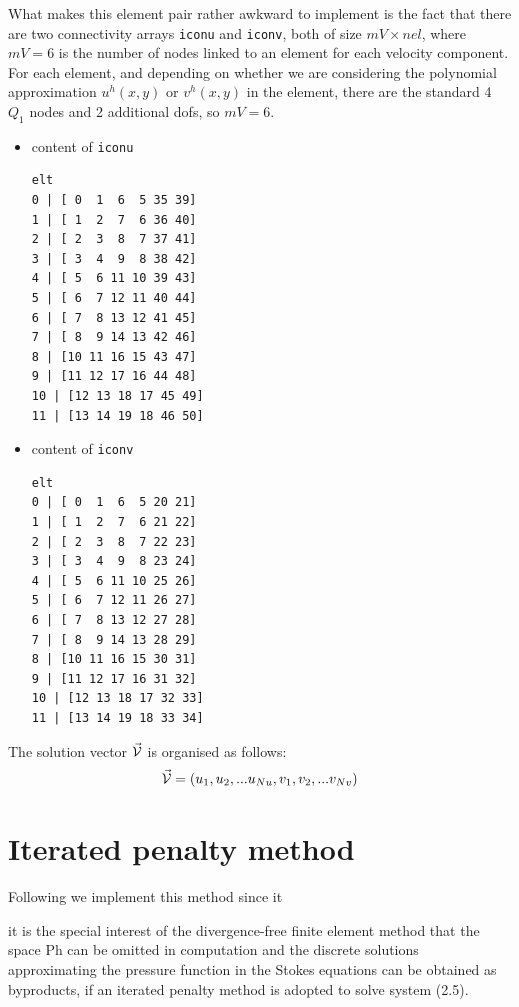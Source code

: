 What makes this element pair rather awkward to implement is the fact that 
there are two connectivity arrays {\tt iconu} and {\tt iconv}, both of size $mV\times nel$, where 
$mV=6$ is the number of nodes linked to an element for each velocity component. 
For each element, and depending on whether we are considering 
the polynomial approximation $u^h(x,y)$ or $v^h(x,y)$ in the element, there are the standard 4 $Q_1$ nodes and 2 additional 
dofs, so $mV=6$.
\begin{itemize}
\item content of {\tt iconu}
\begin{verbatim}
elt
0 | [ 0  1  6  5 35 39]
1 | [ 1  2  7  6 36 40]
2 | [ 2  3  8  7 37 41]
3 | [ 3  4  9  8 38 42]
4 | [ 5  6 11 10 39 43]
5 | [ 6  7 12 11 40 44]
6 | [ 7  8 13 12 41 45]
7 | [ 8  9 14 13 42 46]
8 | [10 11 16 15 43 47]
9 | [11 12 17 16 44 48]
10 | [12 13 18 17 45 49]
11 | [13 14 19 18 46 50]
\end{verbatim}
\item content of {\tt iconv}
\begin{verbatim}
elt
0 | [ 0  1  6  5 20 21]
1 | [ 1  2  7  6 21 22]
2 | [ 2  3  8  7 22 23]
3 | [ 3  4  9  8 23 24]
4 | [ 5  6 11 10 25 26]
5 | [ 6  7 12 11 26 27]
6 | [ 7  8 13 12 27 28]
7 | [ 8  9 14 13 28 29]
8 | [10 11 16 15 30 31]
9 | [11 12 17 16 31 32]
10 | [12 13 18 17 32 33]
11 | [13 14 19 18 33 34]
\end{verbatim}
\end{itemize}


The solution vector $\vec{\cal V}$ is organised as follows:
\[
\vec{\cal V} = ( u_1, u_2, ... u_{Nu}, v_1, v_2, ... v_{Nv})
\]


\newpage
\section*{Iterated penalty method}

Following \cite{zhan09,huzh11} we implement this method since it 

\begin{displayquote}
{\color{darkgray}
it is the special interest
of the divergence-free ﬁnite element method that the space Ph can be omitted
in computation and the discrete solutions approximating the pressure function
in the Stokes equations can be obtained as byproducts, if an iterated penalty
method is adopted to solve system (2.5).}
\end{displayquote}

